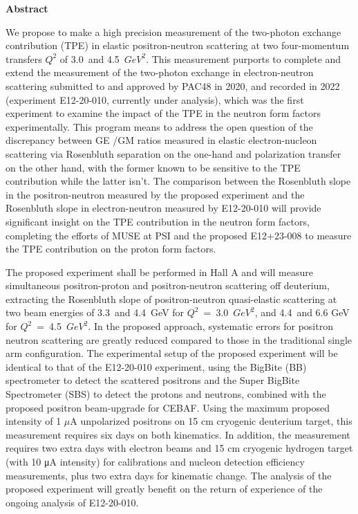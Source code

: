 \begin{center}
{{\large {\bf Abstract}}} 
\end{center}

We propose to make a high precision measurement of the two-photon exchange contribution (TPE) in elastic positron-neutron scattering at two four-momentum transfers $Q^2$ of 3.0~and 4.5~$GeV^2$. This measurement purports to complete and extend the measurement of the two-photon exchange in electron-neutron scattering submitted to and approved by PAC48 in 2020, and recorded in 2022 (experiment E12-20-010, currently under analysis), which was the first experiment to examine the impact of the TPE in the neutron form factors experimentally. This program means to address the open question of the discrepancy between GE /GM ratios measured in elastic electron-nucleon scattering via Rosenbluth separation on the one-hand and polarization transfer on the other hand, with the former known to be sensitive to the TPE contribution while the latter isn’t.
The comparison between the Rosenbluth slope in the positron-neutron measured by the proposed experiment and the Rosenbluth slope in electron-neutron measured by E12-20-010 will provide significant insight on the TPE contribution in the neutron form factors, completing the efforts of MUSE at PSI and the proposed E12+23-008 to measure the TPE contribution on the proton form factors.

The proposed experiment shall be performed in Hall A and will measure simultaneous positron-proton and positron-neutron scattering off deuterium, extracting the Rosenbluth slope of positron-neutron quasi-elastic scattering at two beam energies of 3.3~and 4.4~GeV for $Q^2$~=~3.0~$GeV^2$, and 4.4~and 6.6 GeV for $Q^2$~=~4.5~$GeV^2$. In the proposed approach, systematic errors for positron neutron scattering are greatly reduced compared to those in the traditional single arm configuration.
The experimental setup of the proposed experiment will be identical to that of the E12-20-010 experiment, using the BigBite (BB) spectrometer to detect the scattered positrons and the Super BigBite Spectrometer (SBS) to detect the protons and neutrons, combined with the proposed positron beam-upgrade for CEBAF. Using the maximum proposed intensity of 1 $\mu$A unpolarized positrons on 15 cm cryogenic deuterium target, this measurement requires six days on both kinematics.
In addition, the measurement requires two extra days with electron beams and 15 cm cryogenic hydrogen target (with 10 μA intensity) for calibrations and nucleon detection efficiency measurements, plus two extra days for kinematic change. The analysis of the proposed experiment will greatly benefit on the return of experience of the ongoing analysis of E12-20-010.

